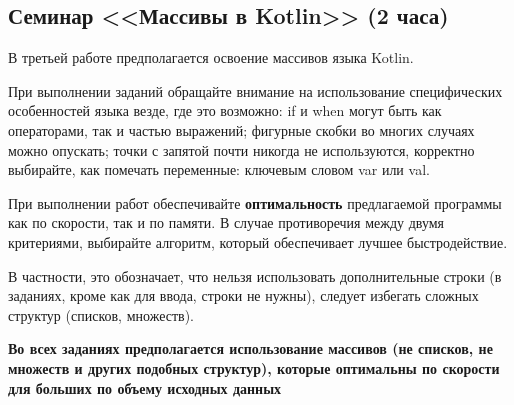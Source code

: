 \subsection{Семинар <<Массивы в Kotlin>> (2 часа)}

В третьей работе предполагается освоение массивов языка Kotlin.

При выполнении заданий обращайте внимание на использование специфических особенностей языка везде, где это возможно: 
if и when могут быть как операторами, так и частью выражений; фигурные скобки во многих случаях можно опускать;
точки с запятой почти никогда не используются, корректно выбирайте, как помечать переменные: ключевым словом var или val.

При выполнении работ обеспечивайте \textbf{оптимальность} предлагаемой программы как по скорости, так и по памяти. В
случае противоречия между двумя критериями, выбирайте алгоритм, который обеспечивает лучшее быстродействие.

В частности, это обозначает, что нельзя использовать дополнительные строки (в заданиях, кроме как для ввода, строки не нужны),
следует избегать сложных структур (списков, множеств).

\textbf{Во всех заданиях предполагается использование массивов (не списков, не множеств и других подобных структур), которые оптимальны по скорости для больших по объему исходных данных}

